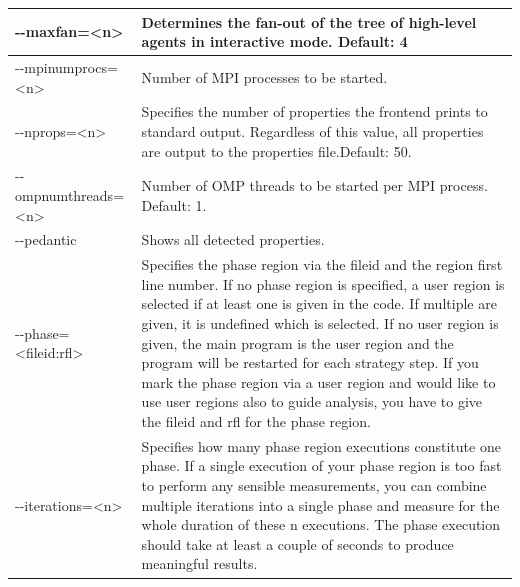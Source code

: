 \documentclass[11pt,oneside,a4paper]{book}
\begin{document}
\begin{center}
\begin{longtable}{|p{5cm}|p{7cm}|}
 -{}-maxfan=\textless n\textgreater &
  Determines the fan-out of the tree of high-level agents in interactive mode.\newline\newline
  Default: 4 \\
  \hline
  -{}-mpinumprocs=\textless n\textgreater &
  Number of MPI processes to be started. \\
  \hline

  -{}-nprops=\textless n\textgreater &
  Specifies the number of properties the frontend prints to standard output. Regardless of this value, all properties are output to the properties file.\newline\newline Default: 50. \\
  \hline

  -{}-ompnumthreads=\textless n\textgreater &
  Number of OMP threads to be started per MPI process. \newline\newline Default: 1.\\
  \hline

  -{}-pedantic &
  Shows all detected properties.\\
  \hline

  -{}-phase=\textless fileid:rfl\textgreater &
  Specifies the phase region via the fileid and the region first line number.\newline\newline
  If no phase region is specified, a user region is selected if at least one is given in the code. If multiple are given, it is undefined which is selected. If no user region is given, the main program is the user region and the  program will be restarted for each strategy step.\newline\newline
  If you mark the phase region via a user region and would like to use user regions also to guide analysis, you have to give the fileid and rfl for the phase region. \\
  \hline

  -{}-iterations=\textless n\textgreater &
  Specifies how many phase region executions constitute one phase.\newline\newline
  If a single execution of your phase region is too fast to perform any sensible measurements, you can combine multiple iterations into a single phase and measure for the whole duration of these n executions.\newline\newline
  The phase execution should take at least a couple of seconds to produce meaningful results. \\
  \hline


\end{longtable}
\end{center}
\end{document}
